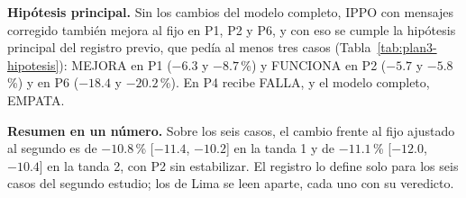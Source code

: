 
\noindent\textbf{Hipótesis principal.} Sin los cambios del modelo
completo, IPPO con mensajes corregido también mejora al fijo en P1, P2 y
P6, y con eso se cumple la hipótesis principal del registro previo, que
pedía al menos tres casos (Tabla~\ref{tab:plan3-hipotesis}): MEJORA en
P1 ($-6.3$ y $-8.7$\,\%) y FUNCIONA en P2 ($-5.7$ y $-5.8$\,\%) y en P6
($-18.4$ y $-20.2$\,\%). En P4 recibe FALLA, y el modelo completo,
EMPATA.

\noindent\textbf{Resumen en un número.} Sobre los seis casos, el cambio
frente al fijo ajustado al segundo es de $-10.8$\,\% [$-11.4$, $-10.2$]
en la tanda 1 y de $-11.1$\,\% [$-12.0$, $-10.4$] en la tanda 2, con P2
sin estabilizar. El registro lo define solo para los seis casos del
segundo estudio; los de Lima se leen aparte, cada uno con su veredicto.

